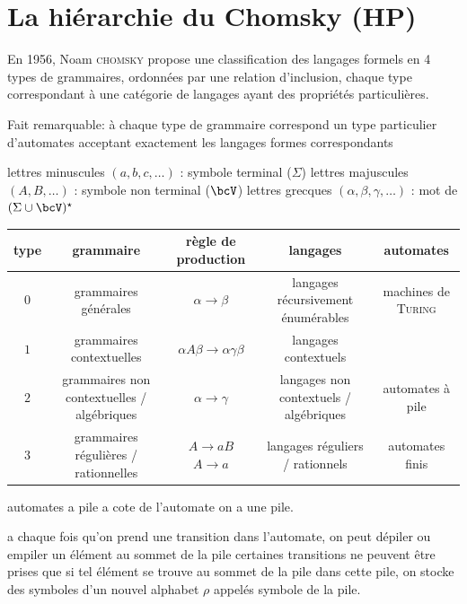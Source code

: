     
    \section{La hiérarchie du Chomsky (HP)}

    En 1956, Noam \textsc{chomsky} propose une classification des langages formels en 4 types de grammaires, ordonnées par une relation d'inclusion, chaque type correspondant à une catégorie de langages ayant des propriétés particulières.
    
    Fait remarquable: à chaque type de grammaire correspond un type particulier d'automates acceptant exactement les langages formes correspondants 

    \begin{notation}
        \begin{enumerate}
            \itt lettres minuscules $(a, b, c, \dots)$ : symbole terminal ($\Sigma$)
            \itt lettres majuscules $(A, B, \dots)$ : symbole non terminal ($\bcV$)
            \itt lettres grecques $(\alpha, \beta, \gamma, \dots)$ : mot de $(\Sigma \cup \bcV)^\star$
        \end{enumerate}
    \end{notation}
    
    \begin{center}
        \begin{NiceTabular}{ccccc}
            \toprule
            type & grammaire & règle de production & langages & automates\\ \midrule
            $0$ & grammaires générales & $\alpha \rightarrow \beta$ & langages récursivement énumérables & machines de \textsc{Turing} \\
            $1$ & grammaires contextuelles & $\alpha A \beta \rightarrow \alpha \gamma \beta$ & langages contextuels &\\
            $2$ & grammaires non contextuelles / algébriques & $\alpha \rightarrow \gamma$ & langages non contextuels / algébriques & automates à pile \\
            $3$ & grammaires régulières / rationnelles & $A \rightarrow aB$ $A \rightarrow a$ & langages réguliers / rationnels & automates finis\\
            \bottomrule
        \end{NiceTabular}
    \end{center}
    
     automates  a pile a cote de l'automate on a une pile. 
    \begin{enumerate}
        \itt a chaque fois qu'on prend une transition dans l'automate, on peut dépiler ou empiler un élément au sommet de la pile
        \itt certaines transitions ne peuvent être prises que si tel élément se trouve au sommet de la pile
        \itt dans cette pile, on stocke des symboles d'un nouvel alphabet $\rho$ appelés symbole de la pile.
    \end{enumerate}
    
